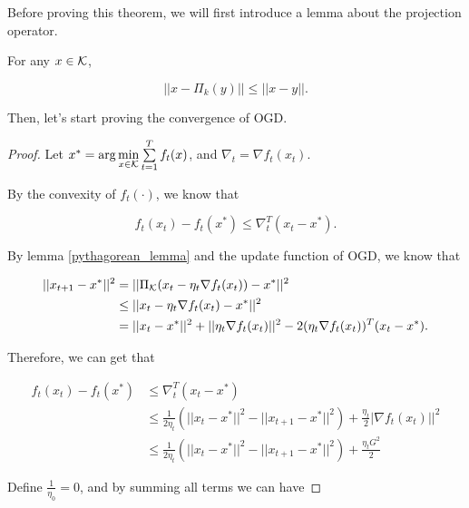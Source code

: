 \documentclass[../main.tex]{subfiles}
\begin{document}
Before proving this theorem, we will first introduce a lemma about the projection operator.

\begin{lemma}\label{pythagorean_lemma}
	For any $x \in \mathcal{K}$, 
	
	\begin{equation*}
	 	||x - \Pi_k(y)|| \leq ||x - y||.
	\end{equation*}
\end{lemma}

Then, let's start proving the convergence of OGD.

\begin{proof}
	Let $x^* = \arg\min\limits_{x\in \mathcal{K}} \sum\limits_{t=1}^T f_t(x)$, and $\nabla_t = \nabla f_t(x_t)$.
	
	By the convexity of $f_t(\cdot)$, we know that 
	
	\begin{equation*}
		f_t(x_t) - f_t(x^*) \leq \nabla_t^T (x_t - x^*).
	\end{equation*}
	
	By lemma \ref{pythagorean_lemma} and the update function of OGD, we know that 
	
	\begin{equation*}
		\begin{aligned}
			||x_{t+1} - x^*||^2 & = || \Pi_{\mathcal{K}} (x_t - \eta_t\nabla f_t(x_t))  - x^*||^2 \\
			& \leq || x_t - \eta_t\nabla f_t(x_t)  - x^*||^2  \\
			& = || x_t - x^*||^2 + || \eta_t\nabla f_t(x_t)||^2 - 2(\eta_t\nabla f_t(x_t))^T( x_t -  x^*).
		\end{aligned}
	\end{equation*}
	
	Therefore, we can get that 
	
	\begin{equation*}
		\begin{aligned}
				f_t(x_t) - f_t(x^*) & \leq \nabla_t^T (x_t - x^*) \\
									& \leq \frac{1}{2\eta_t} ( || x_t - x^*||^2 -  ||x_{t+1} - x^*||^2 ) + \frac{\eta_t}{2}| \nabla f_t(x_t)||^2 \\
									& \leq \frac{1}{2\eta_t} ( || x_t - x^*||^2 -  ||x_{t+1} - x^*||^2 ) + \frac{\eta_t G^2}{2}
		\end{aligned}
	\end{equation*}
	
	Define $\frac{1}{\eta_0} = 0$, and by summing all terms we can have
	

\end{proof}
\end{document}
